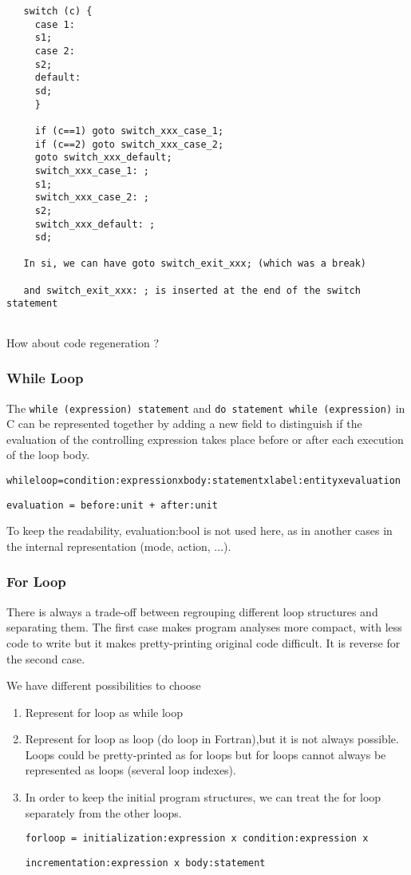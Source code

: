 \documentclass[a4paper]{article}
\begin{document}
\begin{verbatim}
   switch (c) {
     case 1:
     s1;
     case 2: 
     s2;  
     default: 
     sd;
     }

     if (c==1) goto switch_xxx_case_1;
     if (c==2) goto switch_xxx_case_2;
     goto switch_xxx_default;
     switch_xxx_case_1: ;
     s1;
     switch_xxx_case_2: ;
     s2;
     switch_xxx_default: ;
     sd;      

   In si, we can have goto switch_exit_xxx; (which was a break) 

   and switch_exit_xxx: ; is inserted at the end of the switch statement
             
\end{verbatim}
How about code regeneration ? 
\subsubsection{While Loop}
The \verb/while (expression) statement/ and 
\verb/do statement while (expression)/ in C can be represented together
 by adding a new field to distinguish
if the evaluation of the
controlling expression takes place before or after each execution of the
loop body.   

\verb/whileloop=condition:expressionxbody:statementxlabel:entityxevaluation/

\verb/evaluation = before:unit + after:unit/

To keep the readability, evaluation:bool is not used here, as in another
cases in the internal representation (mode, action, ...).

\subsubsection{For Loop}
There is always a trade-off between regrouping different loop structures
and separating them. The first case makes program analyses more compact,
with less code to write but it makes pretty-printing original code
difficult. It is reverse for the second case. 

We have different possibilities to choose
\begin{enumerate}
\item Represent for loop as while loop
\item Represent for loop as loop (do loop in Fortran),but it is not always
  possible. Loops could be pretty-printed as for loops but for loops cannot
  always be represented as loops (several loop indexes).
\item In order to keep the initial program structures, we can treat the for loop
separately from the other loops. 

\verb/forloop = initialization:expression x condition:expression x/

\verb/incrementation:expression x body:statement/
\end{enumerate}
\end{document}
